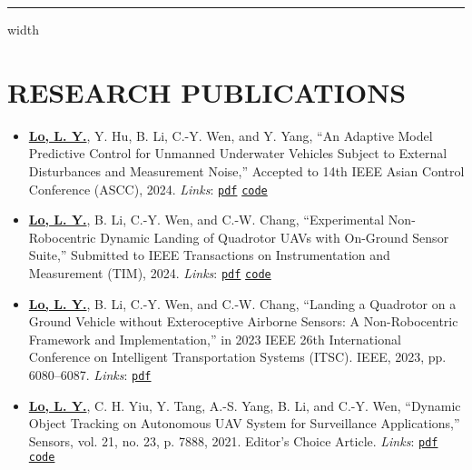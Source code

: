 \documentclass[overlapped]{res}
\newcommand{\pink}[1]{\textcolor{pink!40!red}{#1}} %
\begin{document}
\begin{resume}
\par\noindent\hrule width \linewidth %


\section{RESEARCH PUBLICATIONS}
\begin{itemize}
  \item \underline{\textbf{Lo, L. Y.}}, Y. Hu, B. Li, C.-Y. Wen, and Y. Yang, “An Adaptive Model Predictive Control for Unmanned Underwater Vehicles Subject to External Disturbances and Measurement Noise,” Accepted to 14th IEEE Asian Control Conference (ASCC), 2024. \textit{Links}: \pink{{\texttt{\href{https://pattylo.github.io/assets/pdf/ascc.pdf}{pdf}}} {\texttt{\href{https://github.com/HKPolyU-UAV/bluerov2/tree/eskf_obs2}{code}}}}
  \item \underline{\textbf{Lo, L. Y.}}, B. Li, C.-Y. Wen, and C.-W. Chang, “Experimental Non-Robocentric Dynamic Landing of Quadrotor UAVs with On-Ground Sensor Suite,” Submitted to IEEE Transactions on Instrumentation and Measurement (TIM), 2024. \textit{Links}: \pink{{\texttt{\href{https://pattylo.github.io/assets/pdf/alan_tim.pdf}{pdf}}} {\texttt{\href{https://github.com/HKPolyU-UAV/ALAN}{code}}}} 
  \item \underline{\textbf{Lo, L. Y.}}, B. Li, C.-Y. Wen, and C.-W. Chang, “Landing a Quadrotor on a Ground Vehicle without Exteroceptive Airborne Sensors: A Non-Robocentric Framework and Implementation,” in 2023 IEEE 26th International Conference on Intelligent Transportation Systems (ITSC). IEEE, 2023, pp. 6080–6087. \textit{Links}: \pink{{\texttt{\href{https://pattylo.github.io/assets/pdf/alan_conf_final.pdf}{pdf}}}}
  \item \underline{\textbf{Lo, L. Y.}}, C. H. Yiu, Y. Tang, A.-S. Yang, B. Li, and C.-Y. Wen, “Dynamic Object Tracking on Autonomous UAV System for Surveillance Applications,” Sensors, vol. 21, no. 23, p. 7888, 2021. Editor's Choice Article. \textit{Links}: \pink{{\texttt{\href{https://pattylo.github.io/assets/pdf/sensors-21-07888.pdf}{pdf}}} {\texttt{\href{https://github.com/HKPolyU-UAV/auto}{code}}}}
\end{itemize}


\end{resume}
\end{document}
